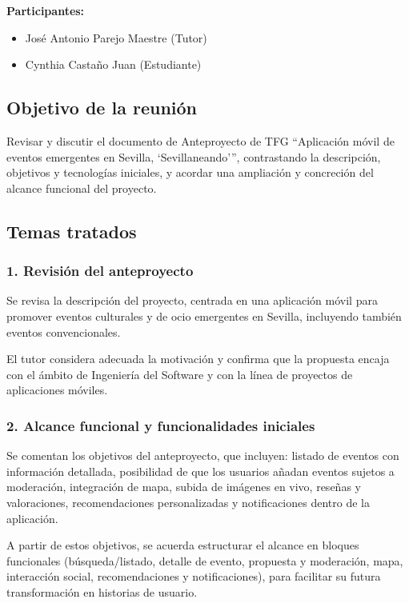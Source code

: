 \textbf{Participantes:}
\begin{itemize}
    \item José Antonio Parejo Maestre (Tutor)
    \item Cynthia Castaño Juan (Estudiante)
\end{itemize}

\subsection*{Objetivo de la reunión}
Revisar y discutir el documento de Anteproyecto de TFG ``Aplicación móvil de eventos emergentes en Sevilla, `Sevillaneando''', contrastando la descripción, objetivos y tecnologías iniciales, y acordar una ampliación y concreción del alcance funcional del proyecto.

\subsection*{Temas tratados}

\subsubsection*{1. Revisión del anteproyecto}
Se revisa la descripción del proyecto, centrada en una aplicación móvil para promover eventos culturales y de ocio emergentes en Sevilla, incluyendo también eventos convencionales.

El tutor considera adecuada la motivación y confirma que la propuesta encaja con el ámbito de Ingeniería del Software y con la línea de proyectos de aplicaciones móviles.

\subsubsection*{2. Alcance funcional y funcionalidades iniciales}
Se comentan los objetivos del anteproyecto, que incluyen: listado de eventos con información detallada, posibilidad de que los usuarios añadan eventos sujetos a moderación, integración de mapa, subida de imágenes en vivo, reseñas y valoraciones, recomendaciones personalizadas y notificaciones dentro de la aplicación.

A partir de estos objetivos, se acuerda estructurar el alcance en bloques funcionales (búsqueda/listado, detalle de evento, propuesta y moderación, mapa, interacción social, recomendaciones y notificaciones), para facilitar su futura transformación en historias de usuario.

